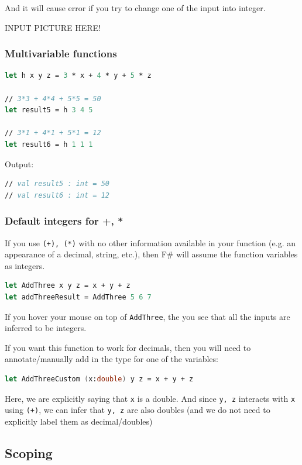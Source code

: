 \documentclass[12pt]{article}
\begin{document}
And it will cause error if you try to change one of the input into integer.
\begin{center}
INPUT PICTURE HERE!
\end{center}

\subsubsection{Multivariable functions}
\begin{lstlisting}[language=FSharp]
let h x y z = 3 * x + 4 * y + 5 * z

// 3*3 + 4*4 + 5*5 = 50
let result5 = h 3 4 5

// 3*1 + 4*1 + 5*1 = 12
let result6 = h 1 1 1
\end{lstlisting}
Output:

\begin{lstlisting}[language=FSharp]
// val result5 : int = 50
// val result6 : int = 12
\end{lstlisting}


\subsubsection{Default integers for +, *}
If you use \texttt{(+), (*)} with no other information available in your function (e.g. an appearance of a decimal, string, etc.), then F\# will assume the function variables as integers.
\begin{lstlisting}[language=FSharp]
let AddThree x y z = x + y + z
let addThreeResult = AddThree 5 6 7
\end{lstlisting}
If you hover your mouse on top of \texttt{AddThree}, the you see that all the inputs are inferred to be integers.

If you want this function to work for decimals, then you will need to annotate/manually add in the type for one of the variables:
\begin{lstlisting}[language=FSharp]
let AddThreeCustom (x:double) y z = x + y + z
\end{lstlisting}
Here, we are explicitly saying that \texttt{x} is a double. And since \texttt{y, z} interacts with \texttt{x} using \texttt{(+)}, we can infer that \texttt{y, z} are also doubles (and we do not need to explicitly label them as decimal/doubles)

\pagebreak

\subsection{Scoping}
\end{document}
